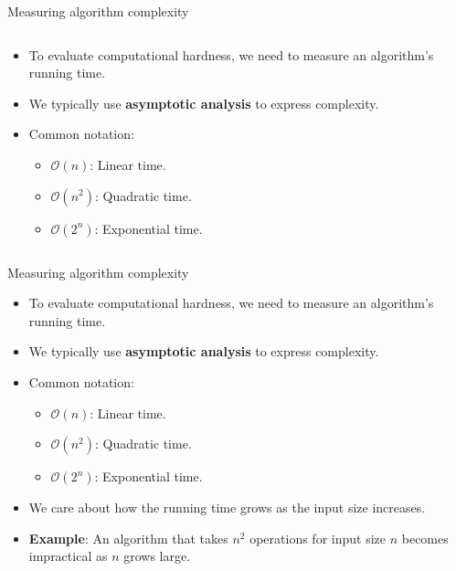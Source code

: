 \documentclass[aspectratio=169, lualatex, handout]{beamer}
\begin{document}
\begin{frame}{Measuring algorithm complexity}
	\begin{columns}[c]
		\begin{column}{0.4\textwidth}
			\begin{itemize}[<+->]
				\item To evaluate computational hardness, we need to measure an algorithm's running time.
				\item We typically use \textbf{asymptotic analysis} to express complexity.
				\item Common notation:
				      \begin{itemize}
					      \item $\mathcal{O}(n)$: Linear time.
					      \item $\mathcal{O}(n^2)$: Quadratic time.
					      \item $\mathcal{O}(2^n)$: Exponential time.
				      \end{itemize}
			\end{itemize}
		\end{column}
		\begin{column}{0.6\textwidth}
		\end{column}
	\end{columns}
\end{frame}

\begin{frame}{Measuring algorithm complexity}
	\begin{itemize}
		\item To evaluate computational hardness, we need to measure an algorithm's running time.
		\item We typically use \textbf{asymptotic analysis} to express complexity.
		\item Common notation:
		      \begin{itemize}
			      \item $\mathcal{O}(n)$: Linear time.
			      \item $\mathcal{O}(n^2)$: Quadratic time.
			      \item $\mathcal{O}(2^n)$: Exponential time.
		      \end{itemize}
		\item We care about how the running time grows as the input size increases.
		\item \textbf{Example}: An algorithm that takes $n^2$ operations for input size $n$ becomes impractical as $n$ grows large.
	\end{itemize}
\end{frame}
\end{document}
